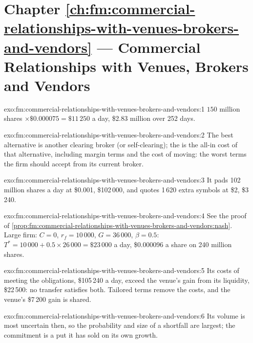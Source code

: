 \section*{Chapter \ref{ch:fm:commercial-relationships-with-venues-brokers-and-vendors} --- Commercial Relationships with Venues, Brokers and Vendors}

\begin{solution}{exo:fm:commercial-relationships-with-venues-brokers-and-vendors:1}
$150$ million shares $\times\$0.000075=\$11\,250$ a day, \$2.83 million over 252 days.
\end{solution}

\begin{solution}{exo:fm:commercial-relationships-with-venues-brokers-and-vendors:2}
The best alternative is another clearing broker (or self-clearing); the  is the all-in cost of that alternative, including
margin terms and the cost of moving: the worst terms the firm should accept from its current broker.
\end{solution}

\begin{solution}{exo:fm:commercial-relationships-with-venues-brokers-and-vendors:3}
It pads 102 million shares a day at \$0.001, \$102\,000, and quotes 1\,620 extra symbols at \$2, \$3\,240.
\end{solution}

\begin{solution}{exo:fm:commercial-relationships-with-venues-brokers-and-vendors:4}
See the proof of \cref{prop:fm:commercial-relationships-with-venues-brokers-and-vendors:nash}. Large firm: $C=0$, $r_f=10\,000$, $G=36\,000$,
$\beta=0.5$: $T^*=10\,000+0.5\times26\,000=\$23\,000$ a day, \$0.000096 a share on 240 million shares.
\end{solution}

\begin{solution}{exo:fm:commercial-relationships-with-venues-brokers-and-vendors:5}
Its costs of meeting the obligations, \$105\,240 a day, exceed the venue's gain from its liquidity, \$22\,500: no transfer satisfies both. Tailored
terms remove the costs, and the venue's \$7\,200 gain is shared.
\end{solution}

\begin{solution}{exo:fm:commercial-relationships-with-venues-brokers-and-vendors:6}
Its volume is most uncertain then, so the probability and size of a shortfall are largest; the commitment is a put it has sold on its own growth.
\end{solution}

